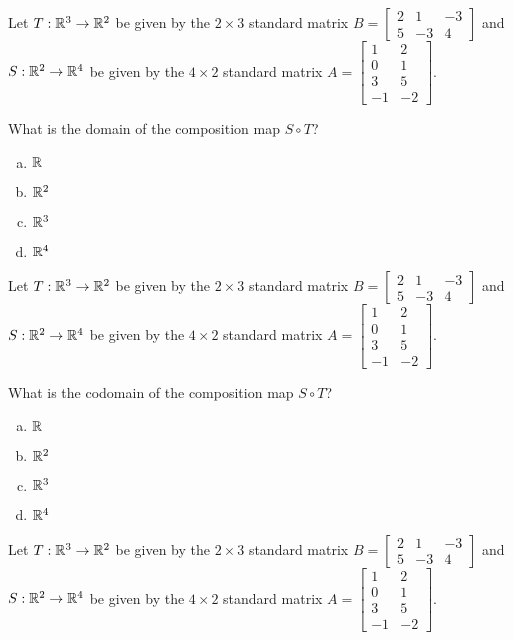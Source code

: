 \begin{applicationActivities}


\begin{activity}{5}
Let $T: \mathbb{R}^3 \rightarrow \mathbb{R}^2$ be given by the \(2\times 3\) standard matrix $B=\begin{bmatrix} 2 & 1 & -3 \\ 5 & -3 & 4 \end{bmatrix}$ and $S: \mathbb{R}^2 \rightarrow \mathbb{R}^4$ be given by the \(4\times 2\) standard matrix $A=\begin{bmatrix} 1 & 2 \\ 0 & 1 \\ 3 & 5 \\ -1 & -2 \end{bmatrix}$.

What is the domain of the composition map $S \circ T$?
\begin{enumerate}[(a)]
\item $\mathbb{R}$
\item $\mathbb{R}^2$
\item $\mathbb{R}^3$
\item $\mathbb{R}^4$
\end{enumerate}
\end{activity}

\begin{activity}{3}
Let $T: \mathbb{R}^3 \rightarrow \mathbb{R}^2$ be given by the \(2\times 3\) standard matrix $B=\begin{bmatrix} 2 & 1 & -3 \\ 5 & -3 & 4 \end{bmatrix}$ and $S: \mathbb{R}^2 \rightarrow \mathbb{R}^4$ be given by the \(4\times 2\) standard matrix $A=\begin{bmatrix} 1 & 2 \\ 0 & 1 \\ 3 & 5 \\ -1 & -2 \end{bmatrix}$.

What is the codomain of the composition map $S \circ T$?
\begin{enumerate}[(a)]
\item $\mathbb{R}$
\item $\mathbb{R}^2$
\item $\mathbb{R}^3$
\item $\mathbb{R}^4$
\end{enumerate}
\end{activity}

\begin{activity}{2}
Let $T: \mathbb{R}^3 \rightarrow \mathbb{R}^2$ be given by the \(2\times 3\) standard matrix $B=\begin{bmatrix} 2 & 1 & -3 \\ 5 & -3 & 4 \end{bmatrix}$ and $S: \mathbb{R}^2 \rightarrow \mathbb{R}^4$ be given by the \(4\times 2\) standard matrix $A=\begin{bmatrix} 1 & 2 \\ 0 & 1 \\ 3 & 5 \\ -1 & -2 \end{bmatrix}$.


\end{activity}
\end{applicationActivities}
